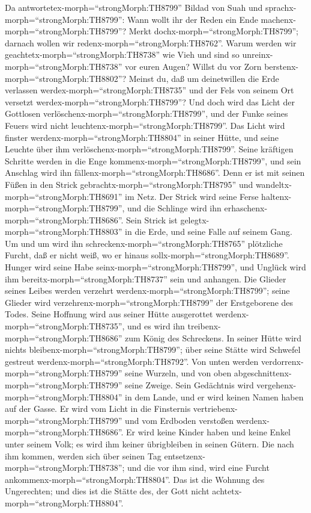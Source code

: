  Da antwortetex-morph=``strongMorph:TH8799'' Bildad von Suah
und sprachx-morph=``strongMorph:TH8799'':  Wann wollt ihr
der Reden ein Ende machenx-morph=``strongMorph:TH8799''? Merkt
dochx-morph=``strongMorph:TH8799''; darnach wollen wir
redenx-morph=``strongMorph:TH8762''.  Warum werden wir
geachtetx-morph=``strongMorph:TH8738'' wie Vieh und sind so
unreinx-morph=``strongMorph:TH8738'' vor euren Augen? 
Willst du vor Zorn berstenx-morph=``strongMorph:TH8802''? Meinst du, daß
um deinetwillen die Erde verlassen werdex-morph=``strongMorph:TH8735''
und der Fels von seinem Ort versetzt
werdex-morph=``strongMorph:TH8799''?  Und doch wird das
Licht der Gottlosen verlöschenx-morph=``strongMorph:TH8799'', und der
Funke seines Feuers wird nicht leuchtenx-morph=``strongMorph:TH8799''.
 Das Licht wird finster werdenx-morph=``strongMorph:TH8804''
in seiner Hütte, und seine Leuchte über ihm
verlöschenx-morph=``strongMorph:TH8799''.  Seine kräftigen
Schritte werden in die Enge kommenx-morph=``strongMorph:TH8799'', und
sein Anschlag wird ihn fällenx-morph=``strongMorph:TH8686''.
 Denn er ist mit seinen Füßen in den Strick
gebrachtx-morph=``strongMorph:TH8795'' und
wandeltx-morph=``strongMorph:TH8691'' im Netz.  Der Strick
wird seine Ferse haltenx-morph=``strongMorph:TH8799'', und die Schlinge
wird ihn erhaschenx-morph=``strongMorph:TH8686''.  Sein
Strick ist gelegtx-morph=``strongMorph:TH8803'' in die Erde, und seine
Falle auf seinem Gang.  Um und um wird ihn
schreckenx-morph=``strongMorph:TH8765'' plötzliche Furcht, daß er nicht
weiß, wo er hinaus sollx-morph=``strongMorph:TH8689''. 
Hunger wird seine Habe seinx-morph=``strongMorph:TH8799'', und Unglück
wird ihm bereitx-morph=``strongMorph:TH8737'' sein und anhangen.
 Die Glieder seines Leibes werden verzehrt
werdenx-morph=``strongMorph:TH8799''; seine Glieder wird
verzehrenx-morph=``strongMorph:TH8799'' der Erstgeborene des Todes.
 Seine Hoffnung wird aus seiner Hütte ausgerottet
werdenx-morph=``strongMorph:TH8735'', und es wird ihn
treibenx-morph=``strongMorph:TH8686'' zum König des Schreckens.
 In seiner Hütte wird nichts
bleibenx-morph=``strongMorph:TH8799''; über seine Stätte wird Schwefel
gestreut werdenx-morph=``strongMorph:TH8792''.  Von unten
werden verdorrenx-morph=``strongMorph:TH8799'' seine Wurzeln, und von
oben abgeschnittenx-morph=``strongMorph:TH8799'' seine Zweige.
 Sein Gedächtnis wird
vergehenx-morph=``strongMorph:TH8804'' in dem Lande, und er wird keinen
Namen haben auf der Gasse.  Er wird vom Licht in die
Finsternis vertriebenx-morph=``strongMorph:TH8799'' und vom Erdboden
verstoßen werdenx-morph=``strongMorph:TH8686''.  Er wird
keine Kinder haben und keine Enkel unter seinem Volk; es wird ihm keiner
übrigbleiben in seinen Gütern.  Die nach ihm kommen, werden
sich über seinen Tag entsetzenx-morph=``strongMorph:TH8738''; und die
vor ihm sind, wird eine Furcht ankommenx-morph=``strongMorph:TH8804''.
 Das ist die Wohnung des Ungerechten; und dies ist die
Stätte des, der Gott nicht achtetx-morph=``strongMorph:TH8804''.

